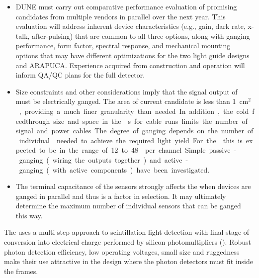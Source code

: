 \begin{itemize}
\item DUNE must carry out comparative performance evaluation of promising  candidates from
multiple vendors %
in parallel over the next year. This evaluation will %
address inherent device characteristics (e.g., gain, dark rate, x-talk, after-pulsing) that are common to all three %
options, along with ganging performance, form factor, spectral response, and mechanical mounting options that may have different optimizations for the two light guide designs and ARAPUCA.
Experience acquired from  construction and operation will inform QA/QC plans for the full detector.

\item Size constraints and other considerations imply that the signal output of  must be electrically ganged.  The area of current candidate  is less than \SI{1}{cm$^2$}, providing a much finer granularity than needed. In addition, the cold feedthrough size and space in the s for cable runs limits the number of  signal and power cables. 
The degree of ganging depends on the number of individual  needed to achieve the required light yield. For the  this is expected to be in the range of \num{12} to \num{48}  per channel. 
Simple passive-ganging (wiring the outputs together) and active-ganging (with active components) have been investigated.

\item The terminal capacitance of the sensors strongly affects the  when devices are ganged in parallel and thus is a factor in  selection. It may ultimately determine the maximum number of individual sensors that can be ganged this way. 
\end{itemize}



The   uses a multi-step approach to scintillation light detection with final stage of conversion into electrical charge performed by silicon photomultipliers (). Robust photon detection efficiency, low operating voltages, small size and ruggedness make their use attractive in the \single design where the photon detectors must  %
fit  inside the  frames. 

